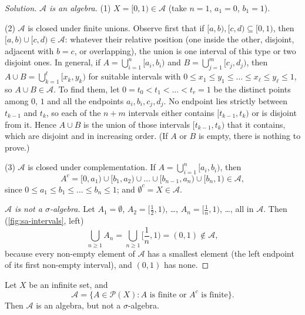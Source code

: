 \begin{proof}[Solution]
\emph{$\mathcal A$ is an algebra.} (1) $X=[0,1)\in\mathcal A$ (take $n=1$, $a_1=0$, $b_1=1$).

(2) $\mathcal A$ is closed under finite unions. Observe first that if $[a,b),[c,d)\subseteq[0,1)$,
then $[a,b)\cup[c,d)\in\mathcal A$: whatever their relative position (one inside the other,
disjoint, adjacent with $b=c$, or overlapping), the union is one interval of this type or two
disjoint ones. In general, if $A=\bigcup_{i=1}^n[a_i,b_i)$ and $B=\bigcup_{j=1}^m[c_j,d_j)$,
then $A\cup B=\bigcup_{k=1}^{\ell}[x_k,y_k)$ for suitable intervals with
$0\le x_1\le y_1\le\dots\le x_\ell\le y_\ell\le1$, so $A\cup B\in\mathcal A$. To find them, let
$0=t_0<t_1<\dots<t_r=1$ be the distinct points among $0$, $1$ and all the endpoints $a_i,b_i,c_j,d_j$.
No endpoint lies strictly between $t_{k-1}$ and $t_k$, so each of the $n+m$ intervals either
contains $[t_{k-1},t_k)$ or is disjoint from it. Hence $A\cup B$ is the union of those intervals
$[t_{k-1},t_k)$ that it contains, which are disjoint and in increasing order. (If $A$ or $B$ is
empty, there is nothing to prove.)

(3) $\mathcal A$ is closed under complementation. If $A=\bigcup_{i=1}^n[a_i,b_i)$, then
\[
  A^c=[0,a_1)\cup[b_1,a_2)\cup\dots\cup[b_{n-1},a_n)\cup[b_n,1)\in\mathcal A,
\]
since $0\le a_1\le b_1\le\dots\le b_n\le1$; and $\emptyset^c=X\in\mathcal A$.

\emph{$\mathcal A$ is not a $\sigma$-algebra.} Let $A_1=\emptyset$, $A_2=[\frac12,1)$, \dots,
$A_n=[\frac1n,1)$, \dots, all in $\mathcal A$. Then (\cref{fig:sa-intervals}, left)
\[
  \bigcup_{n\ge1}A_n=\bigcup_{n\ge1}\Big[\frac1n,1\Big)=(0,1)\notin\mathcal A ,
\]
because every non-empty element of $\mathcal A$ has a smallest element (the left endpoint of its
first non-empty interval), and $(0,1)$ has none.
\end{proof}

\begin{example}\label{exa:sa-finite-cofinite}
Let $X$ be an infinite set, and
\[
  \mathcal A=\{A\in\mathcal P(X): A\text{ is finite or }A^c\text{ is finite}\}.
\]
Then $\mathcal A$ is an algebra, but not a $\sigma$-algebra.
\end{example}

